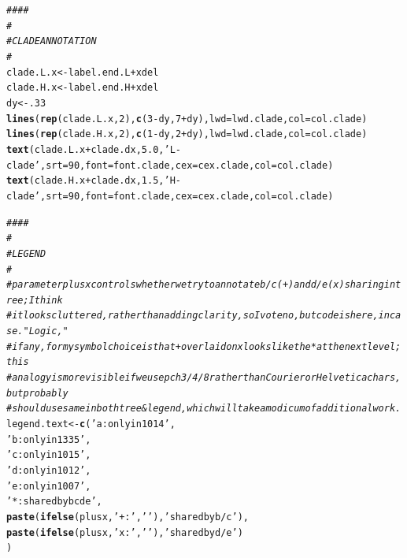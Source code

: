 \documentclass{article}\usepackage[]{graphicx}\usepackage[]{color}
\makeatletter
\newcommand{\hlnum}[1]{\textcolor[rgb]{0.686,0.059,0.569}{#1}}%
\newcommand{\hlstr}[1]{\textcolor[rgb]{0.192,0.494,0.8}{#1}}%
\newcommand{\hlcom}[1]{\textcolor[rgb]{0.678,0.584,0.686}{\textit{#1}}}%
\newcommand{\hlopt}[1]{\textcolor[rgb]{0,0,0}{#1}}%
\newcommand{\hlstd}[1]{\textcolor[rgb]{0.345,0.345,0.345}{#1}}%
\newcommand{\hlkwb}[1]{\textcolor[rgb]{0.69,0.353,0.396}{#1}}%
\newcommand{\hlkwc}[1]{\textcolor[rgb]{0.333,0.667,0.333}{#1}}%
\newcommand{\hlkwd}[1]{\textcolor[rgb]{0.737,0.353,0.396}{\textbf{#1}}}%
\newenvironment{kframe}{%
 \def\at@end@of@kframe{}%
 \ifinner\ifhmode%
  \def\at@end@of@kframe{\end{minipage}}%
  \begin{minipage}{\columnwidth}%
 \fi\fi%
 \def\FrameCommand##1{\hskip\@totalleftmargin \hskip-\fboxsep
 \colorbox{shadecolor}{##1}\hskip-\fboxsep
     \hskip-\linewidth \hskip-\@totalleftmargin \hskip\columnwidth}%
 \MakeFramed {\advance\hsize-\width
   \@totalleftmargin\z@ \linewidth\hsize
   \@setminipage}}%
 {\par\unskip\endMakeFramed%
 \at@end@of@kframe}
\newenvironment{knitrout}{}{} %
\makeatother
\begin{document}
\begin{knitrout}
\begin{kframe}
\begin{alltt}
  \hlcom{####}
  \hlcom{#}
  \hlcom{# CLADE ANNOTATION}
  \hlcom{#}
  \hlstd{clade.L.x} \hlkwb{<-} \hlstd{label.end.L} \hlopt{+} \hlstd{xdel}
  \hlstd{clade.H.x} \hlkwb{<-} \hlstd{label.end.H} \hlopt{+} \hlstd{xdel}
  \hlstd{dy} \hlkwb{<-}\hlnum{.33}
  \hlkwd{lines}\hlstd{(}\hlkwd{rep}\hlstd{(clade.L.x,}\hlnum{2}\hlstd{),}\hlkwd{c}\hlstd{(}\hlnum{3}\hlopt{-}\hlstd{dy,}\hlnum{7}\hlopt{+}\hlstd{dy),}\hlkwc{lwd}\hlstd{=lwd.clade,}\hlkwc{col}\hlstd{=col.clade)}
  \hlkwd{lines}\hlstd{(}\hlkwd{rep}\hlstd{(clade.H.x,}\hlnum{2}\hlstd{),}\hlkwd{c}\hlstd{(}\hlnum{1}\hlopt{-}\hlstd{dy,}\hlnum{2}\hlopt{+}\hlstd{dy),}\hlkwc{lwd}\hlstd{=lwd.clade,}\hlkwc{col}\hlstd{=col.clade)}
  \hlkwd{text}\hlstd{(clade.L.x}\hlopt{+}\hlstd{clade.dx,}\hlnum{5.0}\hlstd{,}\hlstr{'L-clade'}\hlstd{,}\hlkwc{srt}\hlstd{=}\hlnum{90}\hlstd{,}\hlkwc{font}\hlstd{=font.clade,}\hlkwc{cex}\hlstd{=cex.clade,}\hlkwc{col}\hlstd{=col.clade)}
  \hlkwd{text}\hlstd{(clade.H.x}\hlopt{+}\hlstd{clade.dx,}\hlnum{1.5}\hlstd{,}\hlstr{'H-clade'}\hlstd{,}\hlkwc{srt}\hlstd{=}\hlnum{90}\hlstd{,}\hlkwc{font}\hlstd{=font.clade,}\hlkwc{cex}\hlstd{=cex.clade,}\hlkwc{col}\hlstd{=col.clade)}

  \hlcom{####}
  \hlcom{#}
  \hlcom{# LEGEND}
  \hlcom{#}
  \hlcom{# parameter plusx controls whether we try to annotate b/c (+) and d/e (x) sharing in tree; I think}
  \hlcom{# it looks cluttered, rather than adding clarity, so I vote no, but code is here, in case.  "Logic,"}
  \hlcom{# if any, for my symbol choice is that + overlaid on x looks like the * at the next level; this  }
  \hlcom{# analogy is more visible if we use pch 3/4/8 rather than Courier or Helvetica chars, but probably }
  \hlcom{# should use same in both tree & legend, which will take a modicum of additional work.}
  \hlstd{legend.text} \hlkwb{<-} \hlkwd{c}\hlstd{(}\hlstr{'a: only in 1014  '}\hlstd{,}
                   \hlstr{'b: only in 1335  '}\hlstd{,}
                   \hlstr{'c: only in 1015  '}\hlstd{,}
                   \hlstr{'d: only in 1012  '}\hlstd{,}
                   \hlstr{'e: only in 1007  '}\hlstd{,}
                   \hlstr{'*: shared by bcde'}\hlstd{,}
                   \hlkwd{paste}\hlstd{(}\hlkwd{ifelse}\hlstd{(plusx,}\hlstr{'+:'}\hlstd{,}\hlstr{'  '}\hlstd{),}\hlstr{'shared by b/c '}\hlstd{),}
                   \hlkwd{paste}\hlstd{(}\hlkwd{ifelse}\hlstd{(plusx,}\hlstr{'x:'}\hlstd{,}\hlstr{'  '}\hlstd{),}\hlstr{'shared by d/e '}\hlstd{)}
  \hlstd{)}


\end{alltt}
\end{kframe}
\end{knitrout}
\end{document}
